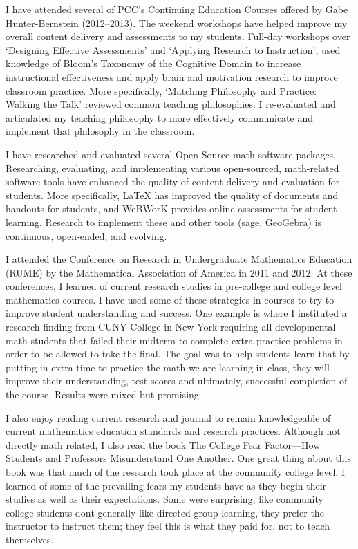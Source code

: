 \begin{description}[style=nextline]
	\item[Dennis Reynolds (Full-time Instructor, Rock Creek Campus)]
	I have attended several of PCC's Continuing Education Courses offered by
	Gabe Hunter-Bernstein (2012--2013).  The weekend workshops have helped
	improve my overall content delivery and assessments to my students. Full-day
	workshops over `Designing Effective Assessments' and `Applying
	Research to Instruction', used knowledge of Bloom's Taxonomy of the
	Cognitive Domain to increase instructional effectiveness and apply brain and
	motivation research to improve classroom practice. More specifically,
	`Matching Philosophy and Practice: Walking the Talk' reviewed common
	teaching philosophies. I re-evaluated and articulated my teaching philosophy to
	more effectively communicate and implement that philosophy in the classroom.

	I have researched and evaluated several Open-Source math software packages.
	Researching, evaluating, and implementing various open-sourced, math-related
	software tools have enhanced the quality of content delivery and evaluation for
	students. More specifically, LaTeX has improved the quality of documents and
	handouts for students, and WeBWorK provides online assessments for student
	learning. Research to implement these and other tools (sage, GeoGebra) is
	continuous, open-ended, and evolving.

	\item[Rebecca Ross (Full-time Instructor, Southeast Campus)]
	I attended the Conference on Research in Undergraduate Mathematics Education
	(RUME) by the Mathematical Association of America in 2011 and 2012.  At these
	conferences, I learned of current research studies in pre-college and college
	level mathematics courses.  I have used some of these strategies in courses to
	try to improve student understanding and success.  One example is where I
	instituted a research finding from CUNY College in New York requiring all
	developmental math students that failed their midterm to complete extra
	practice problems in order to be allowed to take the final.  The goal was to
	help students learn that by putting in extra time to practice the math we are
	learning in class, they will improve their understanding, test scores and
	ultimately, successful completion of the course.  Results were mixed but
	promising.

	I also enjoy reading current research and journal to remain knowledgeable of
	current mathematics education standards and research practices.  Although not
	directly math related, I also read the book The College Fear Factor---How
	Students and Professors Misunderstand One Another.  One great thing about this
	book was that much of the research took place at the community college level.  I learned of some of the prevailing fears my students have as they begin their studies as well as their expectations.  Some were surprising, like community college students dont generally like directed group learning, they prefer the instructor to instruct them; they feel this is what they paid for, not to teach themselves.


\end{description}
